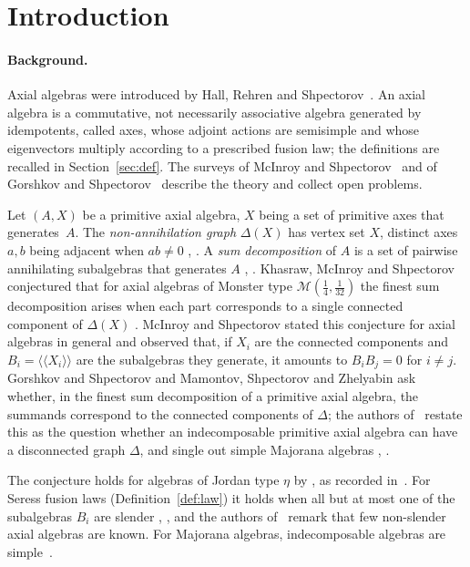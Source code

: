 \documentclass[11pt]{article}
\theoremstyle{definition}
\theoremstyle{remark}
\newcommand{\lla}{\langle\!\langle}
\newcommand{\rra}{\rangle\!\rangle}
\begin{document}
\section{Introduction}

\paragraph{Background.}
Axial algebras were introduced by Hall, Rehren and
Shpectorov~\cite{hrs1,hrs2}. An axial algebra is a commutative, not
necessarily associative algebra generated by idempotents, called axes, whose
adjoint actions are semisimple and whose eigenvectors multiply according to a
prescribed fusion law; the definitions are recalled in
Section~\ref{sec:def}. The surveys of McInroy and Shpectorov~\cite{ms} and of
Gorshkov and Shpectorov~\cite{gs} describe the theory and collect open
problems.

Let $(A,X)$ be a primitive axial algebra, $X$ being a set of primitive axes
that generates~$A$. The \emph{non-annihilation graph} $\Delta(X)$ has vertex
set $X$, distinct axes $a,b$ being adjacent when $ab\ne0$
\cite[Def.~6.1]{kms}, \cite[Def.~3.15]{ms}. A \emph{sum decomposition} of $A$
is a set of pairwise annihilating subalgebras that generates $A$
\cite[Def.~5.1]{kms}, \cite[Def.~3.11]{ms}. Khasraw, McInroy and
Shpectorov conjectured that for axial algebras of Monster type
$\mathcal M(\frac14,\frac1{32})$ the finest sum decomposition arises when each
part corresponds to a single connected component of $\Delta(X)$
\cite[Conj.~6.2]{kms}. McInroy and Shpectorov stated this conjecture for
axial algebras in general \cite[Conj.~3.16]{ms} and observed that, if $X_i$
are the connected components and $B_i=\lla X_i\rra$ are the subalgebras they
generate, it amounts to $B_iB_j=0$ for $i\ne j$. Gorshkov and Shpectorov
\cite[Problem~3.11]{gs} and Mamontov, Shpectorov and Zhelyabin
\cite[Question~9.5]{msz} ask whether, in the finest sum decomposition of a
primitive axial algebra, the summands correspond to the connected components
of $\Delta$; the authors of~\cite{msz} restate this as the question whether an
indecomposable primitive axial algebra can have a disconnected graph
$\Delta$, and single out simple Majorana algebras \cite[Question~9.6]{msz},
\cite[Problem~3.12]{gs}.

The conjecture holds for algebras of Jordan type $\eta$ by
\cite[Theorem~A]{hss}, as recorded in~\cite{kms,ms}. For Seress fusion laws
(Definition~\ref{def:law}) it holds when all but at most one of the
subalgebras $B_i$ are slender \cite[Thm~6.14]{kms}, \cite[Thm~3.20]{ms}, and
the authors of~\cite{ms} remark that few non-slender axial algebras are
known. For Majorana algebras, indecomposable algebras are simple~\cite{msz}.
\end{document}
